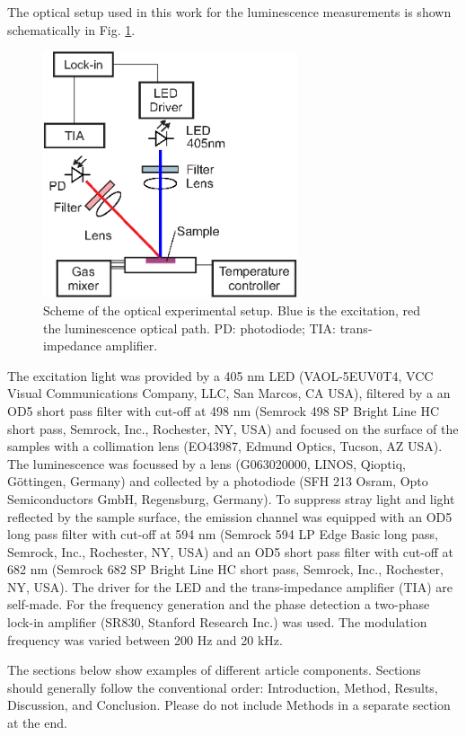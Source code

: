 \documentclass[9pt,twocolumn,twoside,pdftex]{optica}
\begin{document}
The optical setup used in this work for the luminescence measurements is shown schematically in Fig. \ref{fig:setup}.

\begin{figure}[htbp]
\centering
\includegraphics[keepaspectratio, width=7.5cm]{setup.eps}
\caption{Scheme of the optical experimental setup. Blue is the excitation, red the luminescence optical path. PD: photodiode; TIA: trans-impedance amplifier.}
\label{fig:setup}
\end{figure}
The excitation light was provided by a 405 nm LED (VAOL-5EUV0T4, VCC Visual Communications Company, LLC, San Marcos, CA USA), filtered by a an OD5 short pass filter with cut-off at 498 nm (Semrock 498 SP Bright Line HC short pass, Semrock, Inc., Rochester, NY, USA) and focused on the surface of the samples with a collimation lens (EO43987, Edmund Optics, Tucson, AZ USA). The luminescence was focussed by a lens (G063020000, LINOS, Qioptiq, Göttingen, Germany) and collected by a photodiode (SFH 213 Osram, Opto Semiconductors GmbH,  Regensburg, Germany).
To suppress stray light and light reflected by the sample surface, the emission channel was equipped with an OD5 long pass filter with cut-off at 594 nm (Semrock 594 LP Edge Basic long pass, Semrock, Inc., Rochester, NY, USA) and an OD5 short pass filter with cut-off at 682 nm (Semrock 682 SP Bright Line HC short pass, Semrock, Inc., Rochester, NY, USA). The driver for the LED and the trans-impedance amplifier (TIA) are self-made.
For the frequency generation and the phase detection a two-phase lock-in amplifier (SR830, Stanford Research Inc.) was used. The modulation frequency was varied between 200 Hz and 20 kHz.



The sections below show examples of different article components. Sections should generally follow the conventional order: Introduction, Method, Results, Discussion, and Conclusion.  Please do not include Methods in a separate section at the end.
\end{document}
